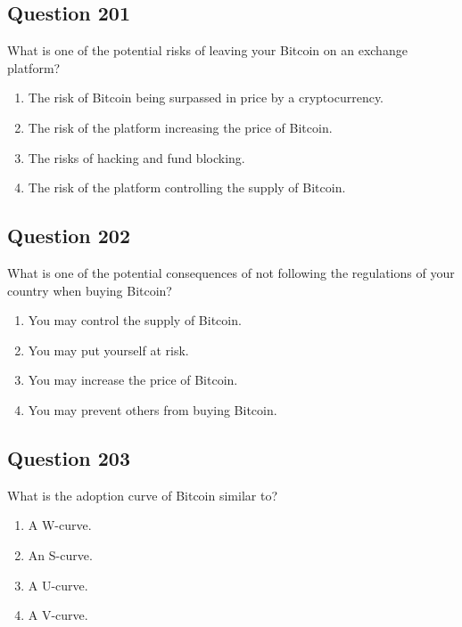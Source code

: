 \documentclass[12pt,a4paper]{article}
\begin{document}
\bigskip


\subsection*{Question 201}
What is one of the potential risks of leaving your Bitcoin on an exchange platform?

\begin{enumerate}[label=\Alph*., leftmargin=*]
\item The risk of Bitcoin being surpassed in price by a cryptocurrency.
\item The risk of the platform increasing the price of Bitcoin.
\item The risks of hacking and fund blocking.
\item The risk of the platform controlling the supply of Bitcoin.
\end{enumerate}

\bigskip


\subsection*{Question 202}
What is one of the potential consequences of not following the regulations of your country when buying Bitcoin?

\begin{enumerate}[label=\Alph*., leftmargin=*]
\item You may control the supply of Bitcoin.
\item You may put yourself at risk.
\item You may increase the price of Bitcoin.
\item You may prevent others from buying Bitcoin.
\end{enumerate}

\bigskip


\subsection*{Question 203}
What is the adoption curve of Bitcoin similar to?

\begin{enumerate}[label=\Alph*., leftmargin=*]
\item A W-curve.
\item An S-curve.
\item A U-curve.
\item A V-curve.
\end{enumerate}
\end{document}
